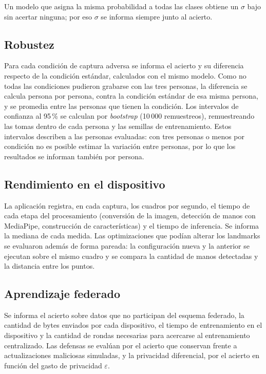 Un modelo que asigna la misma probabilidad a todas las clases obtiene un $\sigma$ bajo sin acertar ninguna; por eso $\sigma$ se informa siempre junto al acierto.

\subsection{Robustez}

Para cada condición de captura adversa se informa el acierto y su diferencia respecto de la condición estándar, calculados con el mismo modelo. Como no todas las condiciones pudieron grabarse con las tres personas, la diferencia se calcula persona por persona, contra la condición estándar de esa misma persona, y se promedia entre las personas que tienen la condición. Los intervalos de confianza al 95\,\% se calculan por \emph{bootstrap} (10\,000 remuestreos), remuestreando las tomas dentro de cada persona y las semillas de entrenamiento. Estos intervalos describen a las personas evaluadas: con tres personas o menos por condición no es posible estimar la variación entre personas, por lo que los resultados se informan también por persona.

\subsection{Rendimiento en el dispositivo}

La aplicación registra, en cada captura, los cuadros por segundo, el tiempo de cada etapa del procesamiento (conversión de la imagen, detección de manos con MediaPipe, construcción de características) y el tiempo de inferencia. Se informa la mediana de cada medida. Las optimizaciones que podían alterar los landmarks se evaluaron además de forma pareada: la configuración nueva y la anterior se ejecutan sobre el mismo cuadro y se compara la cantidad de manos detectadas y la distancia entre los puntos.

\subsection{Aprendizaje federado}

Se informa el acierto sobre datos que no participan del esquema federado, la cantidad de bytes enviados por cada dispositivo, el tiempo de entrenamiento en el dispositivo y la cantidad de rondas necesarias para acercarse al entrenamiento centralizado. Las defensas se evalúan por el acierto que conservan frente a actualizaciones maliciosas simuladas, y la privacidad diferencial, por el acierto en función del gasto de privacidad $\varepsilon$.

